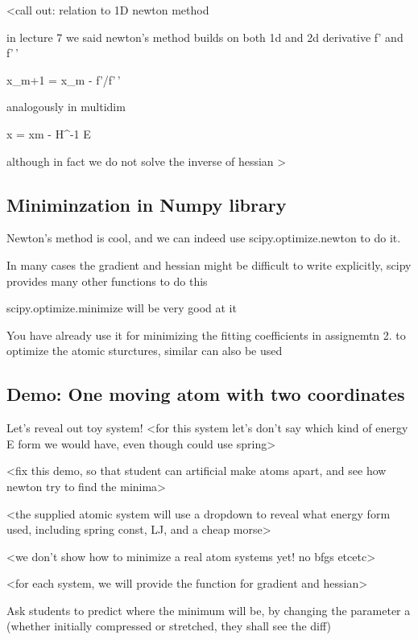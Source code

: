 \documentclass[
  11pt,
  letterpaper,
  DIV=11,
  numbers=noendperiod]{scrartcl}
\begin{document}
\textless call out: relation to 1D newton method

in lecture 7 we said newton's method builds on both 1d and 2d derivative
f' and f'\,'

x\_m+1 = x\_m - f'/f'\,'

analogously in multidim

x = xm - H\^{}-1 E

although in fact we do not solve the inverse of hessian \textgreater{}

\subsection{Miniminzation in Numpy
library}\label{miniminzation-in-numpy-library}

Newton's method is cool, and we can indeed use scipy.optimize.newton to
do it.

In many cases the gradient and hessian might be difficult to write
explicitly, scipy provides many other functions to do this

scipy.optimize.minimize will be very good at it

You have already use it for minimizing the fitting coefficients in
assignemtn 2. to optimize the atomic sturctures, similar can also be
used

\subsection{Demo: One moving atom with two
coordinates}\label{demo-one-moving-atom-with-two-coordinates}

Let's reveal out toy system! \textless for this system let's don't say
which kind of energy E form we would have, even though could use
spring\textgreater{}

\textless fix this demo, so that student can artificial make atoms
apart, and see how newton try to find the minima\textgreater{}

\textless the supplied atomic system will use a dropdown to reveal what
energy form used, including spring const, LJ, and a cheap
morse\textgreater{}

\textless we don't show how to minimize a real atom systems yet! no bfgs
etcetc\textgreater{}

\textless for each system, we will provide the function for gradient and
hessian\textgreater{}

Ask students to predict where the minimum will be, by changing the
parameter a (whether initially compressed or stretched, they shall see
the diff)
\end{document}

